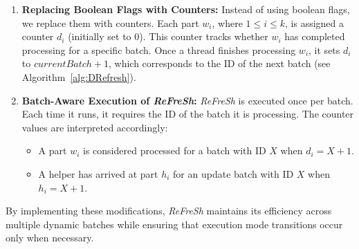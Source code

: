 \documentclass[a4paper,11pt,twoside,openany]{book}
\begin{document}
\begin{enumerate}  
    \item \textbf{Replacing Boolean Flags with Counters:}  
    Instead of using boolean flags, we replace them with counters. Each part $w_i$, where $1 \leq i
    \leq k$, is assigned a counter $d_i$ (initially set to 0). This counter tracks whether $w_i$ has
    completed processing for a specific batch. Once a thread finishes processing $w_i$, it
    sets $d_i$ to $\mathit{currentBatch} + 1$, which corresponds to the ID of the next
    batch (see Algorithm~\ref{alg:DRefresh}).  

    \item \textbf{Batch-Aware Execution of \textit{ReFreSh}:}  
    \textit{ReFreSh} is executed once per batch. Each time it runs, it requires the ID of the
    batch it is processing. The counter values are interpreted accordingly:  
    \begin{itemize}  
        \item A part $w_i$ is considered processed for a batch with ID $X$ when $d_i = X + 1$.  
        \item A helper has arrived at part $h_i$ for an update batch with ID $X$ when $h_i = X + 1$.  
    \end{itemize}  
\end{enumerate}  

By implementing these modifications, \textit{ReFreSh} maintains its efficiency across
multiple dynamic batches while ensuring that execution mode transitions occur only when necessary.


\end{document}
